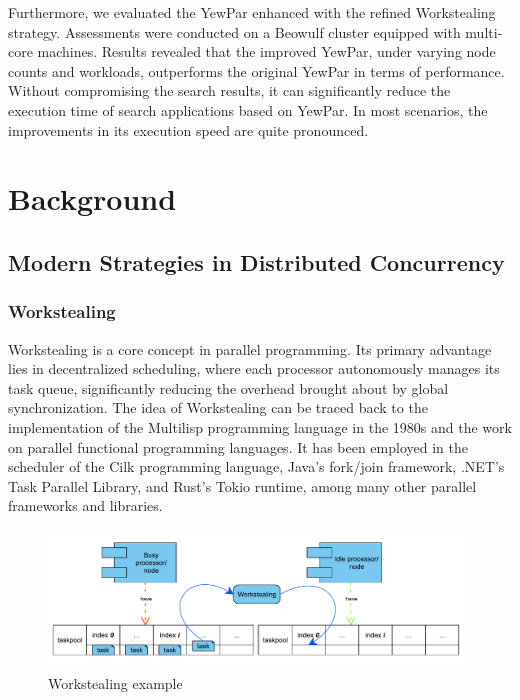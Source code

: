 \documentclass{mproj}
\begin{document}
Furthermore, we evaluated the YewPar enhanced with the refined Workstealing strategy.
Assessments were conducted on a Beowulf cluster equipped with multi-core machines.
Results revealed that the improved YewPar, under varying node counts and workloads, outperforms the original YewPar in terms of performance.
Without compromising the search results, it can significantly reduce the execution time of search applications based on YewPar.
In most scenarios, the improvements in its execution speed are quite pronounced.

\chapter{Background}\label{survey}

\section{Modern Strategies in Distributed Concurrency}
\subsection{Workstealing}

Workstealing is a core concept in parallel programming.
Its primary advantage lies in decentralized scheduling,
where each processor autonomously manages its task queue,
significantly reducing the overhead brought about by global synchronization.
The idea of Workstealing can be traced back to the implementation of the Multilisp programming language in the 1980s and the work on parallel functional programming languages\cite{10.1145/324133.324234}.
It has been employed in the scheduler of the Cilk programming language\cite{BLUMOFE199655},
Java's fork/join framework\cite{lea2000forkjoin},
.NET's Task Parallel Library\cite{leijen2009design},
and Rust's Tokio runtime\cite{tokio,krill2021tokio},
among many other parallel frameworks and libraries.

\begin{figure}[h]
    \centering
    \includegraphics[width=0.98\textwidth]{images/workstealing.pdf}
    \caption{Workstealing example}
    \label{fig:workstealing}
\end{figure}
\FloatBarrier
\end{document}
